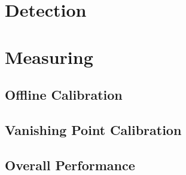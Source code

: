 \section{Detection}



\section{Measuring}








\subsection{Offline Calibration}
\subsection{Vanishing Point Calibration}

\subsection{Overall Performance}




